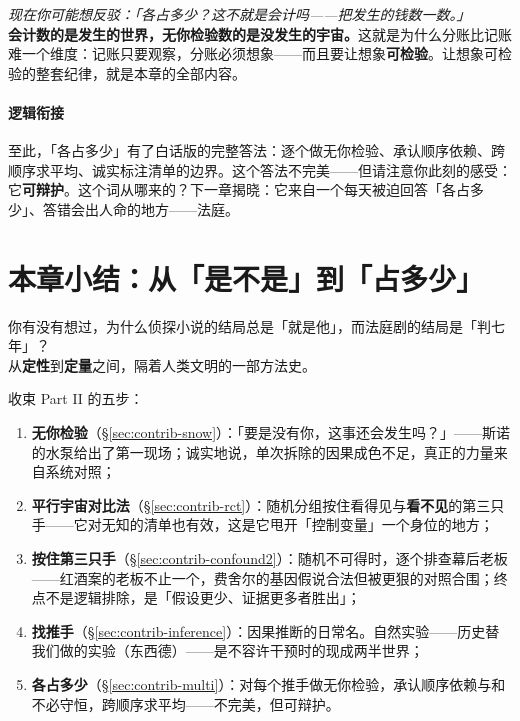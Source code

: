 \documentclass[../../main2.tex]{subfiles}
\begin{document}
	\begin{questionbox}
		\textit{现在你可能想反驳：「各占多少？这不就是会计吗——把发生的钱数一数。」}\\
		\textbf{会计数的是发生的世界，无你检验数的是\textbf{没发生的宇宙}。}这就是为什么分账比记账难一个维度：记账只要观察，分账必须想象——而且要让想象\textbf{可检验}。让想象可检验的整套纪律，就是本章的全部内容。
	\end{questionbox}

	\paragraph*{逻辑衔接}
	至此，「各占多少」有了白话版的完整答法：逐个做无你检验、承认顺序依赖、跨顺序求平均、诚实标注清单的边界。这个答法不完美——但请注意你此刻的感受：它\textbf{可辩护}。这个词从哪来的？下一章揭晓：它来自一个每天被迫回答「各占多少」、答错会出人命的地方——法庭。

	\section{本章小结：从「是不是」到「占多少」}
	\label{sec:contrib-summary}

	\begin{readingnote}
		你有没有想过，为什么侦探小说的结局总是「就是他」，而法庭剧的结局是「判七年」？\\
		从\textbf{定性}到\textbf{定量}之间，隔着人类文明的一部方法史。
	\end{readingnote}

	收束 Part II 的五步：
	\begin{enumerate}
		\item \textbf{无你检验}（§\ref{sec:contrib-snow}）：「要是没有你，这事还会发生吗？」——斯诺的水泵给出了第一现场；诚实地说，单次拆除的因果成色不足，真正的力量来自系统对照；
		\item \textbf{平行宇宙对比法}（§\ref{sec:contrib-rct}）：随机分组按住看得见与\textbf{看不见}的第三只手——它对无知的清单也有效，这是它甩开「控制变量」一个身位的地方；
		\item \textbf{按住第三只手}（§\ref{sec:contrib-confound2}）：随机不可得时，逐个排查幕后老板——红酒案的老板不止一个，费舍尔的基因假说合法但被更狠的对照合围；终点不是逻辑排除，是「假设更少、证据更多者胜出」；
		\item \textbf{找推手}（§\ref{sec:contrib-inference}）：因果推断的日常名。自然实验——历史替我们做的实验（东西德）——是不容许干预时的现成两半世界；
		\item \textbf{各占多少}（§\ref{sec:contrib-multi}）：对每个推手做无你检验，承认顺序依赖与和不必守恒，跨顺序求平均——不完美，但可辩护。
	\end{enumerate}
\end{document}
